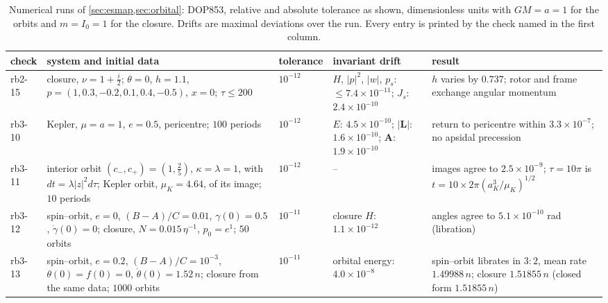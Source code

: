 \begin{table}[t]
\centering\small
\begin{tabular}{@{}>{\raggedright\arraybackslash}p{1.2cm}>{\raggedright\arraybackslash}p{4.6cm}>{\raggedright\arraybackslash}p{1.6cm}>{\raggedright\arraybackslash}p{3.1cm}>{\raggedright\arraybackslash}p{3.5cm}@{}}
\toprule
check & system and initial data & tolerance & invariant drift & result\\
\midrule
rb2-15 & closure, $\nu=1+\tfrac i2$; $\theta=0$, $h=1.1$, $p=(1,0.3,-0.2,0.1,0.4,-0.5)$, $x=0$; $\tau\le200$ & $10^{-12}$ & $H$, $|p|^2$, $|w|$, $p_s$: $\le7.4\times10^{-11}$; $J_s$: $2.4\times10^{-10}$ & $h$ varies by $0.737$; rotor and frame exchange angular momentum\\
rb3-10 & Kepler, $\mu=a=1$, $e=0.5$, pericentre; $100$ periods & $10^{-12}$ & $E$: $4.5\times10^{-10}$; $|\mathbf L|$: $1.6\times10^{-10}$; $\mathbf A$: $1.9\times10^{-10}$ & return to pericentre within $3.3\times10^{-7}$; no apsidal precession\\
rb3-11 & interior orbit $(c_-,c_+)=(1,\tfrac25)$, $\kappa=\lambda=1$, with $dt=\lambda|z|^2d\tau$; Kepler orbit, $\mu_K=4.64$, of its image; $10$ periods & $10^{-12}$ & -- & images agree to $2.5\times10^{-9}$; $\tau=10\pi$ is $t=10\times2\pi(a_K^3/\mu_K)^{1/2}$\\
rb3-12 & spin--orbit, $e=0$, $(B-A)/C=0.01$, $\gamma(0)=0.5$, $\dot\gamma(0)=0$; closure, $N=0.015\,\eta^{-1}$, $p_0=e^1$; $50$ orbits & $10^{-11}$ & closure $H$: $1.1\times10^{-12}$ & angles agree to $5.1\times10^{-10}$ rad (libration)\\
rb3-13 & spin--orbit, $e=0.2$, $(B-A)/C=10^{-3}$, $\theta(0)=f(0)=0$, $\dot\theta(0)=1.52\,n$; closure from the same data; $1000$ orbits & $10^{-11}$ & orbital energy: $4.0\times10^{-8}$ & spin--orbit librates in $3{:}2$, mean rate $1.49988\,n$; closure $1.51855\,n$ (closed form $1.51855\,n$)\\
\bottomrule
\end{tabular}
\caption{Numerical runs of \cref{sec:esmap,sec:orbital}: DOP853, relative and absolute tolerance as shown, dimensionless units with $GM=a=1$ for the
orbits and $m=I_0=1$ for the closure. Drifts are maximal deviations over the run. Every entry is printed by the check named in the first column.}
\label{tab:numerics}
\end{table}

